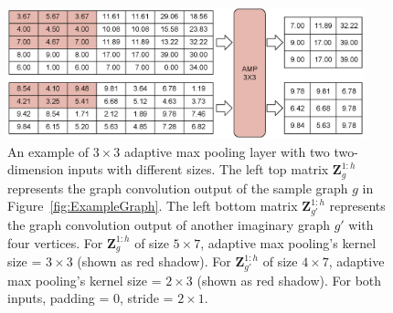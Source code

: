 \begin{figure}[htbp]
\centerline{\includegraphics[width=0.92\textwidth]{Magic/figures/ExampleAmp.eps}}
\caption{An example of $3\times 3$ adaptive max pooling layer with two two-dimension inputs with different sizes.
The left top matrix $\mathbf{Z}^{1:h}_g$ represents the graph convolution output of the sample graph $g$ in Figure~\ref{fig:ExampleGraph}.
The left bottom matrix $\mathbf{Z}^{1:h}_{g'}$ represents the graph convolution output of another imaginary graph $g'$ with four vertices.
For $\mathbf{Z}^{1:h}_g$ of size $5\times 7$, adaptive max pooling's kernel size = $3 \times 3$ (shown as red shadow).
For $\mathbf{Z}^{1:h}_{g'}$ of size $4\times 7$, adaptive max pooling's kernel size = $2 \times 3$ (shown as red shadow).
For both inputs, padding = 0, stride = $2 \times 1$.}
\label{fig:ExampleAmp}
\end{figure}
